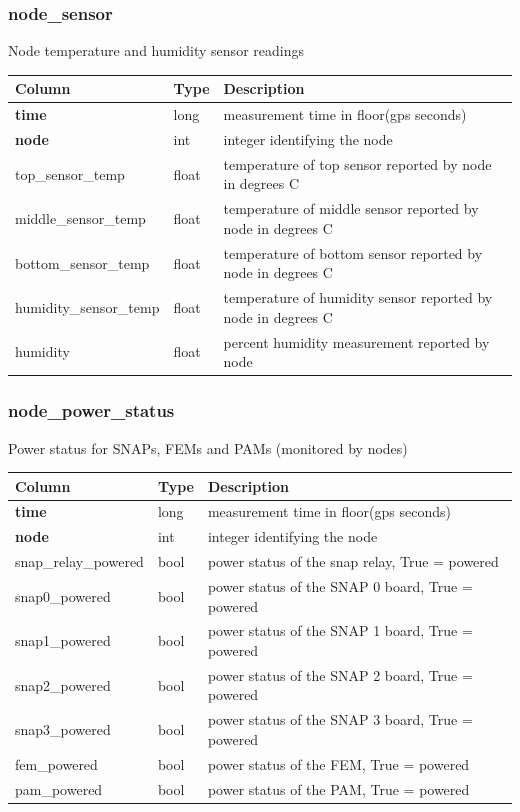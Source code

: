 \documentclass{article}
\begin{document}
\subsubsection{node\_sensor}
Node temperature and humidity sensor readings
\begin{center}
 \begin{tabular}{| p{4cm} | p{2cm} | p{10cm} |}
\hline
 {\bf Column} & {\bf Type}  & {\bf Description} \\ [0.5ex]  \hline\hline
\textbf{time} & long & measurement time in floor(gps seconds)\\ \hline
\textbf{node} & int & integer identifying the node \\ \hline
top\_sensor\_temp & float & temperature of top sensor reported by node in degrees C \\\hline
middle\_sensor\_temp & float & temperature of middle sensor reported by node in degrees C \\\hline
bottom\_sensor\_temp & float & temperature of bottom sensor reported by node in degrees C \\\hline
humidity\_sensor\_temp & float & temperature of humidity sensor reported by node in degrees C \\\hline
humidity & float & percent humidity measurement reported by node\\\hline
\end{tabular}
\end{center}

\subsubsection{node\_power\_status}
Power status for SNAPs, FEMs and PAMs (monitored by nodes)
\begin{center}
 \begin{tabular}{| p{4cm} | p{2cm} | p{10cm} |}
\hline
 {\bf Column} & {\bf Type}  & {\bf Description} \\ [0.5ex]  \hline\hline
\textbf{time} & long & measurement time in floor(gps seconds)\\ \hline
\textbf{node} & int & integer identifying the node \\ \hline
snap\_relay\_powered & bool & power status of the snap relay, True = powered \\\hline
snap0\_powered & bool & power status of the SNAP 0 board, True = powered \\\hline
snap1\_powered & bool & power status of the SNAP 1 board, True = powered \\\hline
snap2\_powered & bool & power status of the SNAP 2 board, True = powered \\\hline
snap3\_powered & bool & power status of the SNAP 3 board, True = powered \\\hline
fem\_powered & bool & power status of the FEM, True = powered \\\hline
pam\_powered & bool & power status of the PAM, True = powered \\\hline
\end{tabular}
\end{center}
\end{document}
